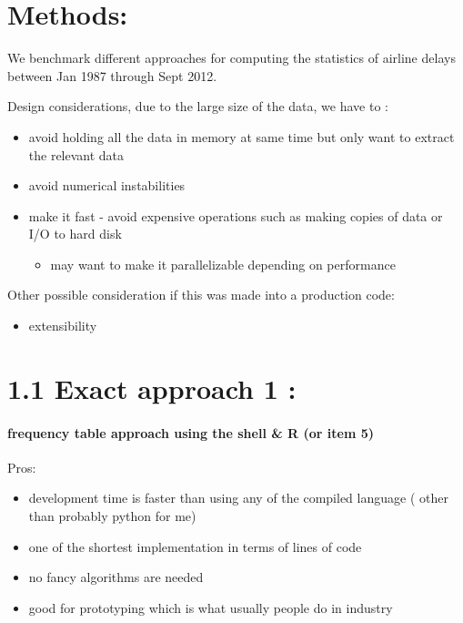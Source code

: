 \documentclass[letterpaper,10pt,english]{/usr/local/lib/python2.7/dist-packages/sphinx/texinputs/sphinxhowto}
\begin{document}
        
    
\part{
 Methods:
}
We benchmark different approaches for computing the statistics of
airline delays between Jan 1987 through Sept 2012.

Design considerations, due to the large size of the data, we have to :

\begin{itemize}
\item
  avoid holding all the data in memory at same time but only want to
  extract the relevant data
\item
  avoid numerical instabilities
\item
  make it fast - avoid expensive operations such as making copies of
  data or I/O to hard disk

  \begin{itemize}
  \itemsep1pt\parskip0pt
  \item
    may want to make it parallelizable depending on performance
  \end{itemize}
\end{itemize}

Other possible consideration if this was made into a production code:

\begin{itemize}
\itemsep1pt\parskip0pt
\item
  extensibility
\end{itemize}\part{1.1 Exact approach 1 :}\subsection{frequency table approach using the shell \& R (or item 5)}Pros:

\begin{itemize}
\itemsep1pt\parskip0pt
\item
  development time is faster than using any of the compiled language (
  other than probably python for me)
\item
  one of the shortest implementation in terms of lines of code
\item
  no fancy algorithms are needed
\item
  good for prototyping which is what usually people do in industry
\end{itemize}
\end{document}
